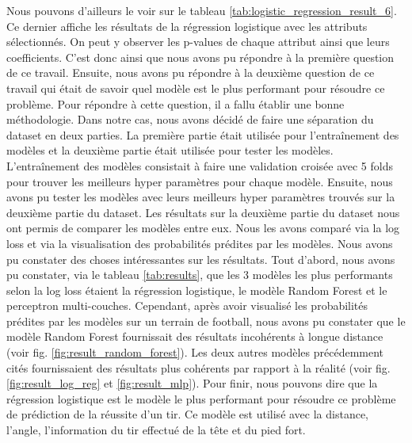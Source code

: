 \documentclass[12pt]{article}
\begin{document}
Nous pouvons d'ailleurs le voir sur le tableau \ref{tab:logistic_regression_result_6}.
Ce dernier affiche les résultats de la régression logistique avec les attributs sélectionnés. 
On peut y observer les p-values de chaque attribut ainsi que leurs coefficients.
C'est donc ainsi que nous avons pu répondre à la première question de ce travail.
\newline\newline
Ensuite, nous avons pu répondre à la deuxième question de ce travail qui était de savoir quel modèle est le plus performant pour résoudre ce problème.
Pour répondre à cette question, il a fallu établir une bonne méthodologie.
\newline\newline
Dans notre cas, nous avons décidé de faire une séparation du dataset en deux parties.
La première partie était utilisée pour l'entraînement des modèles et la deuxième partie était utilisée pour tester les modèles.
L'entraînement des modèles consistait à faire une validation croisée avec 5 folds pour trouver les meilleurs hyper paramètres pour chaque modèle.
Ensuite, nous avons pu tester les modèles avec leurs meilleurs hyper paramètres trouvés sur la deuxième partie du dataset.
\newline\newline
Les résultats sur la deuxième partie du dataset nous ont permis de comparer les modèles entre eux.
Nous les avons comparé via la log loss et via la visualisation des probabilités prédites par les modèles.
Nous avons pu constater des choses intéressantes sur les résultats.
Tout d'abord, nous avons pu constater, via le tableau \ref{tab:results}, que les 3 modèles les plus performants selon la log loss étaient la régression logistique, le modèle Random Forest et le perceptron multi-couches.
Cependant, après avoir visualisé les probabilités prédites par les modèles sur un terrain de football, nous avons pu constater que le modèle Random Forest fournissait des résultats incohérents à longue distance (voir fig. \ref{fig:result_random_forest}).
Les deux autres modèles précédemment cités fournissaient des résultats plus cohérents par rapport à la réalité (voir fig. \ref{fig:result_log_reg} et \ref{fig:result_mlp}).
\newline\newline
Pour finir, nous pouvons dire que la régression logistique est le modèle le plus performant pour résoudre ce problème de prédiction de la réussite d'un tir.
Ce modèle est utilisé avec la distance, l'angle, l'information du tir effectué de la tête et du pied fort.
\newpage
\end{document}
